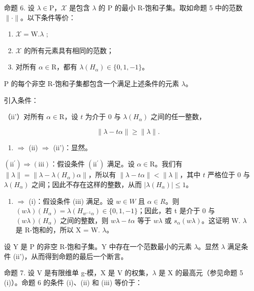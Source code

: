 命题 6. 设 \(\lambda \in \mathrm{P}\)，\(\mathcal{X}\) 是包含 \(\lambda\) 的 P 的最小 R-饱和子集。取如命题 5 中的范数 \(\| \cdot \|\)。以下条件等价：

\begin{enumerate}
\def\labelenumi{(\roman{enumi})}
\item
  \(\mathcal{X} = \mathrm{W}.\lambda\) ;
\item
  \(\mathcal{X}\) 的所有元素具有相同的范数；
\item
  对所有 \(\alpha \in \mathrm{R}\)，都有 \(\lambda(H_{\alpha}) \in \{0,1,-1\}\)。
\end{enumerate}

P 的每个非空 R-饱和子集都包含一个满足上述条件的元素 \(\lambda\)。

引入条件：

（ii'）对所有 \(\alpha \in \mathrm{R}\)，设 \(t\) 为介于 0 与 \(\lambda(H_{\alpha})\) 之间的任一整数，

\[
\| \lambda - t \alpha \| \geq \| \lambda \|.
\]

\begin{enumerate}
\def\labelenumi{(\roman{enumi})}
\tightlist
\item
  \(\Longrightarrow\) (ii) \(\Longrightarrow\) (ii')：显然。
\end{enumerate}

\((\mathrm{ii}^{\prime}) \Longrightarrow (\mathrm{iii})\)：假设条件 \((\mathrm{ii}^{\prime})\) 满足。设 \(\alpha \in \mathrm{R}\)。我们有 \(\| \lambda \| = \| \lambda - \lambda (H_{\alpha})\alpha \|\)，所以有 \(\| \lambda - t\alpha \| < \| \lambda \|\)，其中 \(t\) 严格位于 0 与 \(\lambda (H_{\alpha})\) 之间；因此不存在这样的整数，从而 \(|\lambda (H_{\alpha})| \leq 1\)。

\begin{enumerate}
\def\labelenumi{(\roman{enumi})}
\setcounter{enumi}{2}
\tightlist
\item
  \(\Longrightarrow\) (i)：假设条件 (iii) 满足。设 \(w \in W\) 且 \(\alpha \in R\)。则 \((w\lambda)(H_{\alpha}) = \lambda(H_{w^{-1}\alpha}) \in \{0,1,-1\}\)；因此，若 t 是介于 0 与 \((w\lambda)(H_{\alpha})\) 之间的整数，则 \(w\lambda - t\alpha\) 等于 \(w\lambda\) 或 \(s_{\alpha}(w\lambda)\)。这证明 W. \(\lambda\) 是 R-饱和的，所以 X = W. \(\lambda\)。
\end{enumerate}

设 Y 是 P 的非空 R-饱和子集。Y 中存在一个范数最小的元素 \(\lambda\)。显然 \(\lambda\) 满足条件 (ii')，从而得到命题的最后一个断言。

命题 7. 设 V 是有限维单 g-模，X 是 V 的权集，\(\lambda\) 是 X 的最高元（参见命题 5 (i)）。命题 6 的条件 (i)、(ii) 和 (iii) 等价于：

